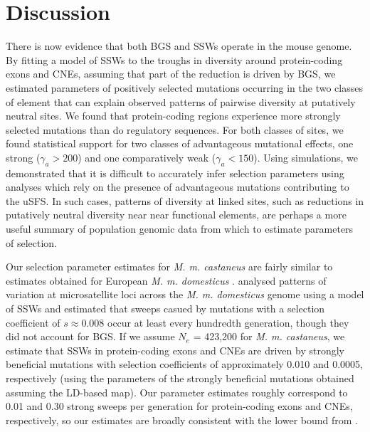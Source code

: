 {%
%
%

\section{Discussion}

	There is now evidence that both BGS and SSWs operate in the mouse genome. By fitting a model of SSWs to the troughs in diversity around protein-coding exons and CNEs, assuming that part of the reduction is driven by BGS, we estimated parameters of positively selected mutations occurring in the two classes of element that can explain observed patterns of pairwise diversity at putatively neutral sites. We found that protein-coding regions experience more strongly selected mutations than do regulatory sequences. For both classes of sites, we found statistical support for two classes of advantageous mutational effects, one strong ($\gamma_a > 200$) and one comparatively weak ($\gamma_a < 150$). Using simulations, we demonstrated that it is difficult to accurately infer selection parameters using analyses which rely on the presence of advantageous mutations contributing to the uSFS. In such cases, patterns of diversity at linked sites, such as reductions in putatively neutral diversity near near functional elements, are perhaps a more useful summary of population genomic data from which to estimate parameters of selection.
	
	Our selection parameter estimates for \textit{M. m. castaneus} are fairly similar to estimates obtained for European \textit{M. m. domesticus} \citep{RN355}. \cite{RN355} analysed patterns of variation at microsatellite loci across the \textit{M. m. domesticus} genome using a model of SSWs and estimated that sweeps casued by mutations with a selection coefficient of $s \approx 0.008$ occur at least every hundredth generation, though they did not account for BGS. If we assume $N_e$ = 423,200 for \textit{M. m. castaneus}, we estimate that SSWs in protein-coding exons and CNEs are driven by strongly beneficial mutations with selection coefficients of approximately 0.010 and 0.0005, respectively (using the parameters of the strongly beneficial mutations obtained assuming the LD-based map). Our parameter estimates roughly correspond to  0.01 and 0.30 strong sweeps per generation for protein-coding exons and CNEs, respectively, so our estimates are broadly consistent with the lower bound from \cite{RN355}.
	
}
